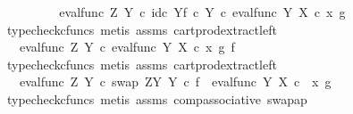 \begin{isabellebody}
\ \ \ \ \isamarkupfalse%
\ \isamarkupfalse%
\ {\isachardoublequoteopen}{\isachardot}{\kern0pt}{\isachardot}{\kern0pt}{\isachardot}{\kern0pt}\ {\isacharequal}{\kern0pt}\ eval{\isacharunderscore}{\kern0pt}func\ Z\ Y\ {\isasymcirc}\isactrlsub c\ {\isasymlangle}id\isactrlsub c\ Y{\isacharcomma}{\kern0pt}f\ {\isasymcirc}\isactrlsub c\ {\isasymbeta}\isactrlbsub Y\isactrlesub {\isasymrangle}\ {\isasymcirc}\isactrlsub c\ eval{\isacharunderscore}{\kern0pt}func\ Y\ X\ {\isasymcirc}\isactrlsub c\ {\isasymlangle}x\ {\isacharcomma}{\kern0pt}g{\isasymrangle}{\isachardoublequoteclose}\isanewline
\ \ \ \ \ \ \isamarkupfalse%
\ {\isacharparenleft}{\kern0pt}typecheck{\isacharunderscore}{\kern0pt}cfuncs{\isacharcomma}{\kern0pt}\ metis\ assms{\isacharparenleft}{\kern0pt}{}{\isacharparenright}{\kern0pt}\ cart{\isacharunderscore}{\kern0pt}prod{\isacharunderscore}{\kern0pt}extract{\isacharunderscore}{\kern0pt}left{\isacharparenright}{\kern0pt}\isanewline
\ \ \ \ \isamarkupfalse%
\ \isamarkupfalse%
\ {\isachardoublequoteopen}{\isachardot}{\kern0pt}{\isachardot}{\kern0pt}{\isachardot}{\kern0pt}\ {\isacharequal}{\kern0pt}\ eval{\isacharunderscore}{\kern0pt}func\ Z\ Y\ {\isasymcirc}\isactrlsub c\ {\isasymlangle}eval{\isacharunderscore}{\kern0pt}func\ Y\ X\ {\isasymcirc}\isactrlsub c\ {\isasymlangle}x\ {\isacharcomma}{\kern0pt}g{\isasymrangle}\ {\isacharcomma}{\kern0pt}f{\isasymrangle}{\isachardoublequoteclose}\isanewline
\ \ \ \ \ \ \isamarkupfalse%
\ {\isacharparenleft}{\kern0pt}typecheck{\isacharunderscore}{\kern0pt}cfuncs{\isacharcomma}{\kern0pt}\ metis\ assms\ cart{\isacharunderscore}{\kern0pt}prod{\isacharunderscore}{\kern0pt}extract{\isacharunderscore}{\kern0pt}left{\isacharparenright}{\kern0pt}\isanewline
\ \ \ \ \isamarkupfalse%
\ \isamarkupfalse%
\ {\isachardoublequoteopen}{\isachardot}{\kern0pt}{\isachardot}{\kern0pt}{\isachardot}{\kern0pt}\ {\isacharequal}{\kern0pt}\ {\isacharparenleft}{\kern0pt}eval{\isacharunderscore}{\kern0pt}func\ Z\ Y\ {\isasymcirc}\isactrlsub c\ swap\ {\isacharparenleft}{\kern0pt}Z\isactrlbsup Y\isactrlesup {\isacharparenright}{\kern0pt}\ Y{\isacharparenright}{\kern0pt}\ {\isasymcirc}\isactrlsub c\ {\isasymlangle}f\ {\isacharcomma}{\kern0pt}\ eval{\isacharunderscore}{\kern0pt}func\ Y\ X\ {\isasymcirc}\isactrlsub c\ \ {\isasymlangle}x{\isacharcomma}{\kern0pt}\ g{\isasymrangle}{\isasymrangle}{\isachardoublequoteclose}\isanewline
\ \ \ \ \ \ \isamarkupfalse%
\ {\isacharparenleft}{\kern0pt}typecheck{\isacharunderscore}{\kern0pt}cfuncs{\isacharcomma}{\kern0pt}\ metis\ assms\ comp{\isacharunderscore}{\kern0pt}associative{}\ swap{\isacharunderscore}{\kern0pt}ap{\isacharparenright}{\kern0pt}\isanewline

\end{isabellebody}
